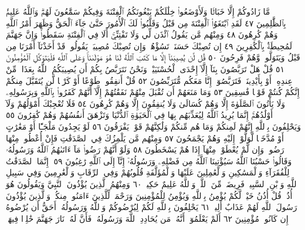 مَّا زَادُوكُمْ إِلَّا خَبَالࣰا وَلَأَوْضَعُوا۟ خِلَٰلَكُمْ يَبْغُونَكُمُ
ٱلْفِتْنَةَ وَفِيكُمْ سَمَّٰعُونَ لَهُمْۗ وَٱللَّهُ عَلِيمُۢ بِٱلظَّٰلِمِينَ ٤٧
لَقَدِ ٱبْتَغَوُا۟ ٱلْفِتْنَةَ مِن قَبْلُ وَقَلَّبُوا۟ لَكَ ٱلْأُمُورَ حَتَّىٰ
جَآءَ ٱلْحَقُّ وَظَهَرَ أَمْرُ ٱللَّهِ وَهُمْ كَٰرِهُونَ ٤٨ وَمِنْهُم
مَّن يَقُولُ ٱئْذَن لِّي وَلَا تَفْتِنِّيٓۚ أَلَا فِي ٱلْفِتْنَةِ سَقَطُوا۟ۗ وَإِنَّ
جَهَنَّمَ لَمُحِيطَةُۢ بِٱلْكَٰفِرِينَ ٤٩ إِن تُصِبْكَ
حَسَنَةࣱ تَسُؤْهُمْۖ وَإِن تُصِبْكَ مُصِيبَةࣱ يَقُولُوا۟ قَدْ
أَخَذْنَآ أَمْرَنَا مِن قَبْلُ وَيَتَوَلَّوا۟ وَّهُمْ فَرِحُونَ ٥٠ قُل
لَّن يُصِيبَنَآ إِلَّا مَا كَتَبَ ٱللَّهُ لَنَا هُوَ مَوْلَىٰنَاۚ وَعَلَى
ٱللَّهِ فَلْيَتَوَكَّلِ ٱلْمُؤْمِنُونَ ٥١ قُلْ هَلْ تَرَبَّصُونَ بِنَآ إِلَّآ
إِحْدَى ٱلْحُسْنَيَيْنِۖ وَنَحْنُ نَتَرَبَّصُ بِكُمْ أَن يُصِيبَكُمُ ٱللَّهُ
بِعَذَابࣲ مِّنْ عِندِهِۦٓ أَوْ بِأَيْدِينَاۖ فَتَرَبَّصُوٓا۟ إِنَّا مَعَكُم
مُّتَرَبِّصُونَ ٥٢ قُلْ أَنفِقُوا۟ طَوْعًا أَوْ كَرْهࣰا لَّن يُتَقَبَّلَ
مِنكُمْ إِنَّكُمْ كُنتُمْ قَوْمࣰا فَٰسِقِينَ ٥٣ وَمَا
مَنَعَهُمْ أَن تُقْبَلَ مِنْهُمْ نَفَقَٰتُهُمْ إِلَّآ أَنَّهُمْ كَفَرُوا۟
بِٱللَّهِ وَبِرَسُولِهِۦ وَلَا يَأْتُونَ ٱلصَّلَوٰةَ إِلَّا وَهُمْ
كُسَالَىٰ وَلَا يُنفِقُونَ إِلَّا وَهُمْ كَٰرِهُونَ ٥٤
فَلَا تُعْجِبْكَ أَمْوَٰلُهُمْ وَلَآ أَوْلَٰدُهُمْۚ إِنَّمَا يُرِيدُ ٱللَّهُ لِيُعَذِّبَهُم
بِهَا فِي ٱلْحَيَوٰةِ ٱلدُّنْيَا وَتَزْهَقَ أَنفُسُهُمْ وَهُمْ كَٰفِرُونَ ٥٥
وَيَحْلِفُونَ بِٱللَّهِ إِنَّهُمْ لَمِنكُمْ وَمَا هُم مِّنكُمْ وَلَٰكِنَّهُمْ
قَوْمࣱ يَفْرَقُونَ ٥٦ لَوْ يَجِدُونَ مَلْجَـًٔا أَوْ مَغَٰرَٰتٍ أَوْ مُدَّخَلࣰا
لَّوَلَّوْا۟ إِلَيْهِ وَهُمْ يَجْمَحُونَ ٥٧ وَمِنْهُم مَّن يَلْمِزُكَ فِي
ٱلصَّدَقَٰتِ فَإِنْ أُعْطُوا۟ مِنْهَا رَضُوا۟ وَإِن لَّمْ يُعْطَوْا۟ مِنْهَآ إِذَا
هُمْ يَسْخَطُونَ ٥٨ وَلَوْ أَنَّهُمْ رَضُوا۟ مَآ ءَاتَىٰهُمُ ٱللَّهُ وَرَسُولُهُۥ
وَقَالُوا۟ حَسْبُنَا ٱللَّهُ سَيُؤْتِينَا ٱللَّهُ مِن فَضْلِهِۦ وَرَسُولُهُۥٓ
إِنَّآ إِلَى ٱللَّهِ رَٰغِبُونَ ٥٩۞ إِنَّمَا ٱلصَّدَقَٰتُ لِلْفُقَرَآءِ وَٱلْمَسَٰكِينِ
وَٱلْعَٰمِلِينَ عَلَيْهَا وَٱلْمُؤَلَّفَةِ قُلُوبُهُمْ وَفِي ٱلرِّقَابِ
وَٱلْغَٰرِمِينَ وَفِي سَبِيلِ ٱللَّهِ وَٱبْنِ ٱلسَّبِيلِۖ فَرِيضَةࣰ
مِّنَ ٱللَّهِۗ وَٱللَّهُ عَلِيمٌ حَكِيمࣱ ٦٠ وَمِنْهُمُ ٱلَّذِينَ يُؤْذُونَ
ٱلنَّبِيَّ وَيَقُولُونَ هُوَ أُذُنࣱۚ قُلْ أُذُنُ خَيْرࣲ لَّكُمْ يُؤْمِنُ
بِٱللَّهِ وَيُؤْمِنُ لِلْمُؤْمِنِينَ وَرَحْمَةࣱ لِّلَّذِينَ ءَامَنُوا۟
مِنكُمْۚ وَٱلَّذِينَ يُؤْذُونَ رَسُولَ ٱللَّهِ لَهُمْ عَذَابٌ أَلِيمࣱ ٦١
يَحْلِفُونَ بِٱللَّهِ لَكُمْ لِيُرْضُوكُمْ وَٱللَّهُ وَرَسُولُهُۥٓ أَحَقُّ
أَن يُرْضُوهُ إِن كَانُوا۟ مُؤْمِنِينَ ٦٢ أَلَمْ يَعْلَمُوٓا۟ أَنَّهُۥ مَن
يُحَادِدِ ٱللَّهَ وَرَسُولَهُۥ فَأَنَّ لَهُۥ نَارَ جَهَنَّمَ خَٰلِدࣰا فِيهَاۚ
